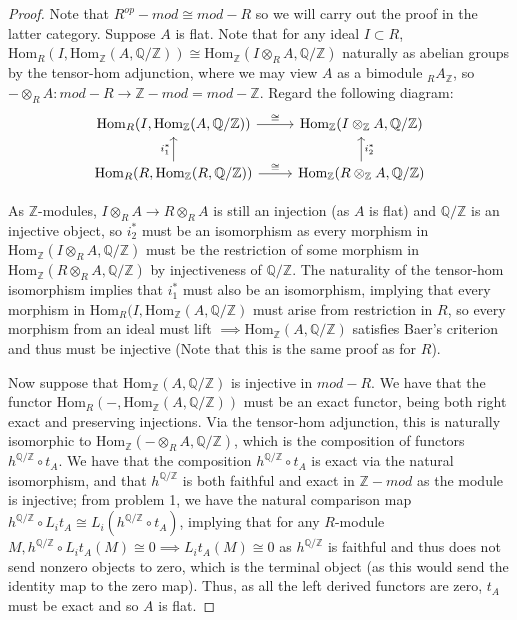 \documentclass{article}
\newcommand{\Hom}{\text{Hom}}
\newcommand{\bb}[1]{\mathbb{#1}}
\begin{document}
\begin{proof}
  Note that $R^{op}-mod \cong mod-R$ so we will carry out the proof in the latter category. Suppose $A$ is flat. Note that for any ideal $I \subset R$, $\Hom_{R}(I, \Hom_{\bb{Z}}(A,\bb{Q}/\bb{Z})) \cong \Hom_{\bb{Z}}(I \otimes_{R} A, \bb{Q/Z})$ naturally as abelian groups by the tensor-hom adjunction, where we may view $A$ as a bimodule $_{R}A_{\bb{Z}}$, so $ - \otimes_{R} A : mod-R \to \bb{Z}-mod = mod-\bb{Z}$. Regard the following diagram:
  \[
    \begin{tikzcd}
\Hom_{R}(I, \Hom_{\bb{Z}}(A,\bb{Q/Z})) \arrow[r, "\cong"]                    &  \Hom_{\bb{Z}}(I \otimes_{\bb{Z}} A, \bb{Q/Z})                     \\
\Hom_{R}(R, \Hom_{\bb{Z}}(R,\bb{Q/Z})) \arrow[u, "i^{*}_{1}"] \arrow[r, "\cong"] & \Hom_{\bb{Z}}(R \otimes_{\bb{Z}} A, \bb{Q/Z}) \arrow[u, "i^{*}_{2}"']
\end{tikzcd}
\]

As $\bb{Z}$-modules, $I \otimes_{R} A \to R \otimes_{R} A$ is still an injection (as $A$ is flat) and $\bb{Q/Z}$ is an injective object, so $i^{*}_{2}$ must be an isomorphism as every morphism in $\Hom_{\bb{Z}}(I \otimes_{R} A,\bb{Q/Z})$ must be the restriction of some morphism in $\Hom_{\bb{Z}}(R \otimes_{R} A,\bb{Q/Z})$ by injectiveness of $\bb{Q/Z}$. The naturality of the tensor-hom isomorphism implies that $i^{*}_{1}$ must also be an isomorphism, implying that every morphism in $\Hom_{R}(I, \Hom_{\bb{Z}}(A,\bb{Q/Z})$ must arise from restriction in $R$, so every morphism from an ideal must lift $\implies \Hom_{\bb{Z}}(A,\bb{Q/Z})$ satisfies Baer's criterion and thus must be injective (Note that this is the same proof as for $R$). 

\hspace{0.2in} Now suppose that $\Hom_{\bb{Z}}(A, \bb{Q/Z})$ is injective in $mod-R$. We have that the functor $\Hom_{R}(-, \Hom_{\bb{Z}}(A, \bb{Q/Z}))$ must be an exact functor, being both right exact and preserving injections. Via the tensor-hom adjunction, this is naturally isomorphic to $\Hom_{\bb{Z}}(- \otimes_{R} A, \bb{Q/Z})$, which is the composition of functors $h^{\bb{Q/Z}} \circ t_{A}$. We have that the composition $h^{\bb{Q/Z}} \circ t_{A}$ is exact via the natural isomorphism, and that $h^{\bb{Q/Z}}$ is both faithful and exact in $\bb{Z}-mod$ as the module is injective; from problem 1, we have the natural comparison map $h^{\bb{Q/Z}} \circ L_{i}t_{A} \cong L_{i}(h^{\bb{Q/Z}} \circ t_{A})$, implying that for any $R$-module $M, h^{\bb{Q/Z}} \circ L_{i}t_{A}(M) \cong 0 \implies L_{i}t_{A}(M) \cong 0$ as $h^{\bb{Q/Z}}$ is faithful and thus does not send nonzero objects to zero, which is the terminal object (as this would send the identity map to the zero map). Thus, as all the left derived functors are zero, $t_{A}$ must be exact and so $A$ is flat. 
\end{proof}
\end{document}
